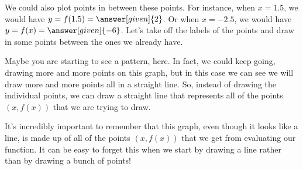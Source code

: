 \documentclass{ximera}
\begin{document}
\begin{example}
\begin{image}
\end{image}
We could also plot points in between these points. For instance, when $x=1.5$, we would have $y = f(1.5) = \answer[given]{2}$. Or when $x=-2.5$, we would have $y=f(x)=\answer[given]{-6}$. Let's take off the labels of the points and draw in some points between the ones we already have.
\begin{image}
\end{image}
Maybe you are starting to see a pattern, here. In fact, we could keep going, drawing more and more points on this graph, but in this case we can see we will draw more and more points all in a straight line. So, instead of drawing the individual points, we can draw a straight line that represents all of the points $(x, f(x))$ that we are trying to draw.
\begin{image}
\end{image}

\end{example}
It's incredibly important to remember that this graph, even though it looks like a line, is made up of all of the points $(x, f(x))$ that we get from evaluating our function. It can be easy to forget this when we start by drawing a line rather than by drawing a bunch of points!
\end{document}
